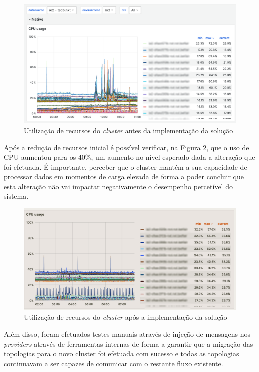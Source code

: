 \begin{figure}[H]
  \centerline{\includegraphics[scale=0.25]{media/content/impl/grafana-before-1.png}}
  \caption{Utilização de recursos do \textit{cluster} antes da implementação da solução}
  \label{usage-before}
\end{figure}

Após a redução de recursos inicial é possível verificar, na Figura \ref{usage-after}, que o uso 
de CPU aumentou para os 40\%, um aumento no nível esperado dada a alteração que foi efetuada. É 
importante, perceber que o \gls{cluster} mantém a sua capacidade de processar dados em momentos de 
carga elevada de forma a poder concluir que esta alteração não vai impactar negativamente o 
desempenho percetível do sistema. 

\begin{figure}[H]
  \centerline{\includegraphics[scale=0.5]{media/content/impl/grafana-after.png}}
  \caption{Utilização de recursos do \textit{cluster} após a implementação da solução}
  \label{usage-after}
\end{figure}

Além disso, foram efetuados testes manuais através de injeção de mensagens nos \textit{providers}
através de ferramentas internas de forma a garantir que a migração das topologias para o novo
\gls{cluster} foi efetuada com sucesso e todas as topologias continuavam a ser capazes de comunicar
com o restante fluxo existente.

